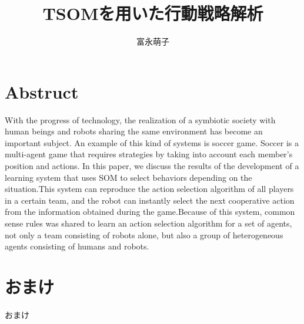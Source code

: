 \documentclass[11pt,twoside]{jreport}
\title{TSOMを用いた行動戦略解析}
\author{富永萌子}
\begin{document}
\beforepreface



\afterpreface
\chapter*{Abstruct}
With the progress of technology, the realization of a symbiotic society with human beings and robots sharing the same environment has become an important subject. An example of this kind of systems is soccer game. Soccer is a multi-agent game that requires strategies by taking into account each member's position and actions. In this paper, we discuss the results of the development of a learning system that uses SOM to select behaviors depending on the situation.This system can reproduce the action selection algorithm of all players in a certain team, and the robot can instantly select the next cooperative action from the information obtained during the game.Because of this system, common sense rules was shared to learn an action selection algorithm for a set of agents, not only a team consisting of robots alone, but also a group of heterogeneous agents consisting of humans and robots.

\clearpage

\clearpage

\clearpage

\clearpage

\clearpage






\appendix
\chapter{おまけ}
おまけ
\end{document}
